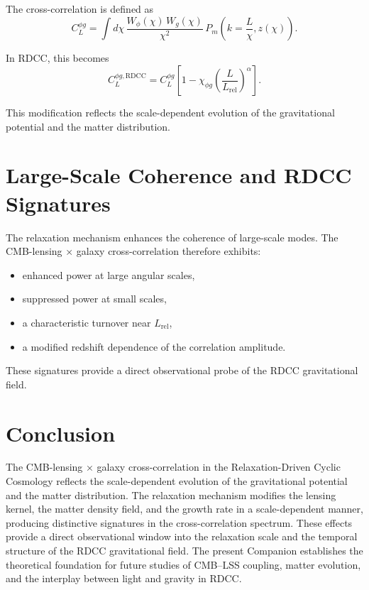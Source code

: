 \documentclass[11pt,a4paper]{article}
\begin{document}
The cross-correlation is defined as
\begin{equation}
    C_{L}^{\phi g}
    = \int d\chi\,
      \frac{W_{\phi}(\chi)\, W_{g}(\chi)}{\chi^{2}}\,
      P_{m}\left(k=\frac{L}{\chi},z(\chi)\right).
\end{equation}

In RDCC, this becomes
\begin{equation}
    C_{L}^{\phi g,\mathrm{RDCC}}
    = C_{L}^{\phi g}
      \left[
        1 - \chi_{\phi g}
        \left(\frac{L}{L_{\mathrm{rel}}}\right)^{\alpha}
      \right].
\end{equation}

This modification reflects the scale-dependent evolution of the gravitational 
potential and the matter distribution.
\section{Large-Scale Coherence and RDCC Signatures}

The relaxation mechanism enhances the coherence of large-scale modes. The 
CMB-lensing × galaxy cross-correlation therefore exhibits:

\begin{itemize}
    \item enhanced power at large angular scales,
    \item suppressed power at small scales,
    \item a characteristic turnover near $L_{\mathrm{rel}}$,
    \item a modified redshift dependence of the correlation amplitude.
\end{itemize}

These signatures provide a direct observational probe of the RDCC gravitational 
field.
\section{Conclusion}

The CMB-lensing × galaxy cross-correlation in the Relaxation-Driven Cyclic 
Cosmology reflects the scale-dependent evolution of the gravitational potential and 
the matter distribution. The relaxation mechanism modifies the lensing kernel, the 
matter density field, and the growth rate in a scale-dependent manner, producing 
distinctive signatures in the cross-correlation spectrum. These effects provide a 
direct observational window into the relaxation scale and the temporal structure of 
the RDCC gravitational field. The present Companion establishes the theoretical 
foundation for future studies of CMB–LSS coupling, matter evolution, and the 
interplay between light and gravity in RDCC.


\nocite{*}

\end{document}

